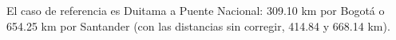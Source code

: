 El caso de referencia es Duitama a Puente Nacional: 309.10 km por Bogotá o 654.25 km por Santander (con las distancias sin corregir, 414.84 y 668.14 km).
